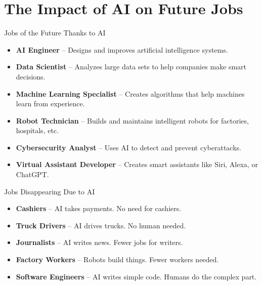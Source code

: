 \documentclass[aspectratio=169]{beamer}
\begin{document}
\section{The Impact of AI on Future Jobs}
\begin{frame}{Jobs of the Future Thanks to AI}
\begin{itemize}
\item \textbf{AI Engineer} – Designs and improves artificial intelligence systems.
\item \textbf{Data Scientist} – Analyzes large data sets to help companies make smart decisions.
\item \textbf{Machine Learning Specialist} – Creates algorithms that help machines learn from experience.
\item \textbf{Robot Technician} – Builds and maintains intelligent robots for factories, hospitals, etc.
\item \textbf{Cybersecurity Analyst} – Uses AI to detect and prevent cyberattacks.
\item \textbf{Virtual Assistant Developer} – Creates smart assistants like Siri, Alexa, or ChatGPT.
\end{itemize}
\end{frame}

\begin{frame}{Jobs Disappearing Due to AI}
\begin{itemize}
\item \textbf{Cashiers} – AI takes payments. No need for cashiers.
\item \textbf{Truck Drivers} – AI drives trucks. No human needed.
\item \textbf{Journalists} – AI writes news. Fewer jobs for writers.
\item \textbf{Factory Workers} – Robots build things. Fewer workers needed.
\item \textbf{Software Engineers} – AI writes simple code. Humans do the complex part.
\end{itemize}
\end{frame}
\end{document}
